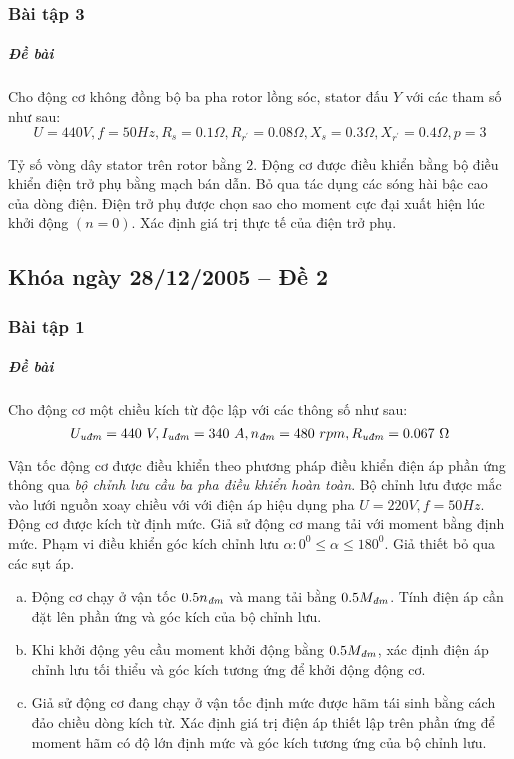 \documentclass[12pt,a4paper]{article}
\begin{document}
\subsubsection{Bài tập 3}
\subparagraph{Đề bài} Cho động cơ không đồng bộ ba pha rotor lồng sóc, stator đấu $Y$ với các tham số như sau: $$ U = 440 \unit{V}, f = 50 \unit{Hz}, R_s = 0.1 \unit{\Omega}, R_{r^ \prime}  = 0.08 \unit{\Omega}, X_s = 0.3 \unit{\Omega}, X_{r^ \prime}  = 0.4 \unit{\Omega}, p = 3$$

Tỷ số vòng dây stator trên rotor bằng $2$. Động cơ được điều khiển bằng bộ điều khiển điện trở phụ bằng mạch bán dẫn. Bỏ qua tác dụng các sóng hài bậc cao của dòng điện. Điện trở phụ được chọn sao cho moment cực đại xuất hiện lúc khởi động $(n=0)$. Xác định giá trị thực tế của điện trở phụ.
\subsection{Khóa ngày 28/12/2005 -- Đề 2}
\subsubsection{Bài tập 1}
\subparagraph{Đề bài} Cho động cơ một chiều kích từ độc lập với các thông số như sau: $$\vqitalic{U} = 440 \unit{V}, \vqitalic{I} = 340 \unit{A}, \vitalic{n} = 480 \unit{rpm}, \vqitalic{R} = 0.067 \unit{\Omega}$$

Vận tốc động cơ được điều khiển theo phương pháp điều khiển điện áp phần ứng thông qua \textit{bộ chỉnh lưu cầu ba pha điều khiển hoàn toàn}. Bộ chỉnh lưu được mắc vào lưới nguồn xoay chiều với với điện áp hiệu dụng pha $U = 220 \unit{V}, f = 50 \unit{Hz}$. Động cơ được kích từ định mức. Giả sử động cơ mang tải với moment bằng định mức. Phạm vi điều khiển góc kích chỉnh lưu $\alpha: 0^0 \leq \alpha \leq  180^0$. Giả thiết bỏ qua các sụt áp.
\begin{enumerate}[a.]
\item Động cơ chạy ở vận tốc $0.5 \vitalic{n}$ và mang tải bằng $0.5 \vitalic{M}$. Tính điện áp cần đặt lên phần ứng và góc kích của bộ chỉnh lưu.
\item Khi khởi động yêu cầu moment khởi động bằng $0.5 \vitalic{M}$, xác định điện áp chỉnh lưu tối thiểu và góc kích tương ứng để khởi động động cơ.
\item Giả sử động cơ đang chạy ở vận tốc định mức được hãm tái sinh bằng cách đảo chiều dòng kích từ. Xác định giá trị điện áp thiết lập trên phần ứng để moment hãm có độ lớn định mức và góc kích tương ứng của bộ chỉnh lưu.
\end{enumerate}
\end{document}
